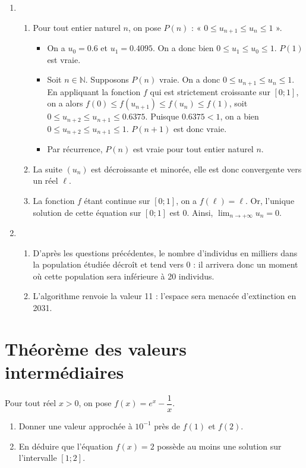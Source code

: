 \documentclass[11pt,fleqn, openany]{book} %
\begin{document}
\begin{solution}
\begin{enumerate}
\item \begin{enumerate}
\item Pour tout entier naturel $n$, on pose $P(n)$ : « $0\leqslant u_{n+1} \leqslant u_n \leqslant 1$ ».
\begin{itemize}
\item On a $u_0=0.6$ et $u_1=0.4095$. On a donc bien $0 \leqslant u_1 \leqslant u_0 \leqslant 1$. $P(1)$ est vraie.
\item Soit $n\in\mathbb{N}$. Supposons $P(n)$ vraie. On a donc $0\leqslant u_{n+1} \leqslant u_n \leqslant 1$. En appliquant la fonction $f$ qui est strictement croissante sur $[0;1]$, on a alors $f(0)\leqslant f(u_{n+1}) \leqslant f(u_n) \leqslant f(1)$, soit $0\leqslant u_{n+2} \leqslant u_{n+1} \leqslant 0.6375$. Puisque $0.6375<1$, on a bien $0\leqslant u_{n+2} \leqslant u_{n+1} \leqslant 1$. $P(n+1)$ est donc vraie.
\item Par récurrence, $P(n)$ est vraie pour tout entier naturel $n$.
\end{itemize}
\item La suite $(u_n)$ est décroissante et minorée, elle est donc convergente vers un réel $\ell$.
\item La fonction $f$ étant continue sur $[0;1]$, on a $f(\ell)=\ell$. Or, l'unique solution de cette équation sur $[0;1]$ est 0. Ainsi, $\displaystyle\lim_{n\to +\infty}u_n=0$.
\end{enumerate}
\item 
\begin{enumerate}
\item D'après les questions précédentes, le nombre d'individus en milliers dans la population étudiée décroît et tend vers 0 : il arrivera donc un moment où cette population sera inférieure à 20 individus.
\item L'algorithme renvoie la valeur 11 : l'espace sera menacée d'extinction en 2031.
\end{enumerate}
\end{enumerate}

\end{solution}





\section*{Théorème des valeurs intermédiaires}


\begin{exercise}[topic=cont03]Pour tout réel $x>0$, on pose $f(x)=e^x-\dfrac{1}{x}$.
\begin{enumerate}
\item Donner une valeur approchée à $10^{-1 }$ près de $f(1)$ et $f(2)$.
\item En déduire que l'équation $f(x)=2$ possède au moins une solution sur l'intervalle $[1;2]$.\end{enumerate}
\end{exercise}
\end{document}
